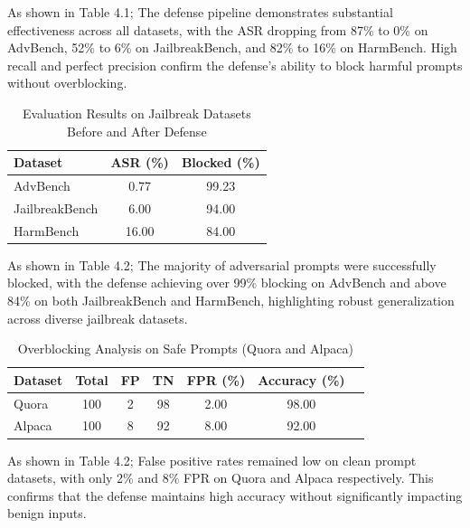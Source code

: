\documentclass[../main.tex]{subfiles}
\begin{document}
\begin{center}
As shown in Table 4.1; The defense pipeline demonstrates substantial effectiveness across all datasets, with the ASR dropping from 87\% to 0\% on AdvBench, 52\% to 6\% on JailbreakBench, and 82\% to 16\% on HarmBench. High recall and perfect precision confirm the defense's ability to block harmful prompts without overblocking.
\end{center}

\begin{table}[H]
\centering
\hspace*{-10pt} %
\caption{Evaluation Results on Jailbreak Datasets Before and After Defense}
\label{tab:jailbreak_eval}
\begin{tabular}{lcc}
\toprule
\textbf{Dataset} & \textbf{ASR (\%)} & \textbf{Blocked (\%)} \\
\midrule
AdvBench         & 0.77             & 99.23                 \\
JailbreakBench   & 6.00             & 94.00                 \\
HarmBench        & 16.00            & 84.00                 \\
\bottomrule
\end{tabular}
\end{table}

\begin{center}
As shown in Table 4.2; The majority of adversarial prompts were successfully blocked, with the defense achieving over 99\% blocking on AdvBench and above 84\% on both JailbreakBench and HarmBench, highlighting robust generalization across diverse jailbreak datasets.
\end{center}

\begin{table}[H]
\centering
\caption{Overblocking Analysis on Safe Prompts (Quora and Alpaca)}
\label{tab:safe_eval}
\begin{tabular}{lcccccc}
\toprule
\textbf{Dataset} & \textbf{Total} & \textbf{FP} & \textbf{TN} & \textbf{FPR (\%)}  & \textbf{Accuracy (\%)} \\
\midrule
Quora   & 100 & 2  & 98  & 2.00   & 98.00 \\
Alpaca  & 100 & 8  & 92  & 8.00   & 92.00 \\
\bottomrule
\end{tabular}
\end{table}

\begin{center}
As shown in Table 4.2; False positive rates remained low on clean prompt datasets, with only 2\% and 8\% FPR on Quora and Alpaca respectively. This confirms that the defense maintains high accuracy without significantly impacting benign inputs.
\end{center}
\end{document}
